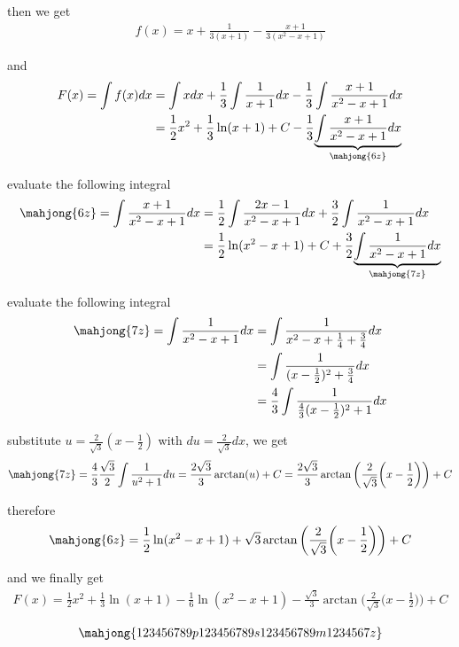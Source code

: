 \documentclass[11pt,a4paper]{article}
\begin{document}
\begin{enumerate}
then we get
\begin{align}
f(x)=x+\frac{1}{3(x+1)}-\frac{x+1}{3(x^2-x+1)}
\end{align}

and
\begin{align}
F(x)=\int f(x)dx
&=\int xdx+\frac{1}{3}\int\frac{1}{x+1}dx-\frac{1}{3}\int\frac{x+1}{x^2-x+1}dx \\
&=\frac{1}{2}x^2+\frac{1}{3}\ln(x+1)+C-\frac{1}{3}
\underset{\mahjong{6z}}{\underbrace{\int\frac{x+1}{x^2-x+1}dx}}
\end{align}

evaluate the following integral
\begin{align}
\mahjong{6z}=\int\frac{x+1}{x^2-x+1}dx
&=\frac{1}{2}\int\frac{2x-1}{x^2-x+1}dx+\frac{3}{2}\int\frac{1}{x^2-x+1}dx \\
&=\frac{1}{2}\ln(x^2-x+1)+C+\frac{3}{2}
\underset{\mahjong{7z}}{\underbrace{\int\frac{1}{x^2-x+1}dx}}
\end{align}

evaluate the following integral
\begin{align}
\mahjong{7z}=\int\frac{1}{x^2-x+1}dx
&=\int\frac{1}{x^2-x+\frac{1}{4}+\frac{3}{4}}dx \\
&=\int\frac{1}{(x-\frac{1}{2})^2+\frac{3}{4}}dx \\
&=\frac{4}{3}\int\frac{1}{\frac{4}{3}(x-\frac{1}{2})^2+1}dx
\end{align}

substitute $u=\frac{2}{\sqrt{3}}(x-\frac{1}{2})$ with $du=\frac{2}{\sqrt{3}}dx$, we get
\begin{align}
\mahjong{7z}=\frac{4}{3}\frac{\sqrt{3}}{2}\int\frac{1}{u^2+1}du=\frac{2\sqrt{3}}{3}\arctan(u)+C=\frac{2\sqrt{3}}{3}\arctan\bigg(\frac{2}{\sqrt{3}}\bigg(x-\frac{1}{2}\bigg)\bigg)+C
\end{align}

\newpage

therefore
\begin{align}
\mahjong{6z}=\frac{1}{2}\ln(x^2-x+1)+\sqrt{3}\arctan\bigg(\frac{2}{\sqrt{3}}\bigg(x-\frac{1}{2}\bigg)\bigg)+C
\end{align}

and we finally get
\begin{align}
F(x)=\frac{1}{2}x^2+\frac{1}{3}\ln(x+1)-\frac{1}{6}\ln(x^2-x+1)-\frac{\sqrt{3}}{3}\arctan\bigg(\frac{2}{\sqrt{3}}\bigg(x-\frac{1}{2}\bigg)\bigg)+C
\end{align}

\end{enumerate}

\vspace*{\fill}
\begin{align*}
\mahjong{123456789p 123456789s 123456789m 1234567z}
\end{align*}
\end{document}
